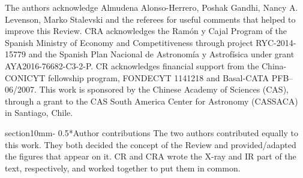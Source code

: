 \documentclass{natureprintstyle}
\makeatletter
\renewcommand{\section}{\@startsection%
{section}{1}{0mm}{-\baselineskip}%
{0.5\baselineskip}{\normalfont\Large\bfseries}}%
\makeatother
\begin{document}
The authors acknowledge Almudena Alonso-Herrero, Poshak Gandhi, Nancy A. Levenson, Marko Stalevski and the referees for useful comments that helped to improve this Review. 
CRA acknowledges the Ram\'on y Cajal Program of the Spanish Ministry of Economy and Competitiveness through project RYC-2014-15779 and the Spanish Plan Nacional de Astronom\' ia y 
Astrof\' isica under grant AYA2016-76682-C3-2-P. CR acknowledges financial support from the China-CONICYT fellowship program, FONDECYT 1141218 and Basal-CATA PFB--06/2007.
This work is sponsored by the Chinese 
Academy of Sciences (CAS), through a grant to the CAS South America Center for Astronomy (CASSACA) in Santiago, Chile. \\


\section*{Author contributions}
The two authors contributed equally to this work. They both decided the concept of the Review and provided/adapted the figures that appear on it. 
CR and CRA wrote the X-ray and IR part of the text, respectively, and worked together to put them in common.  

%
\end{document}

